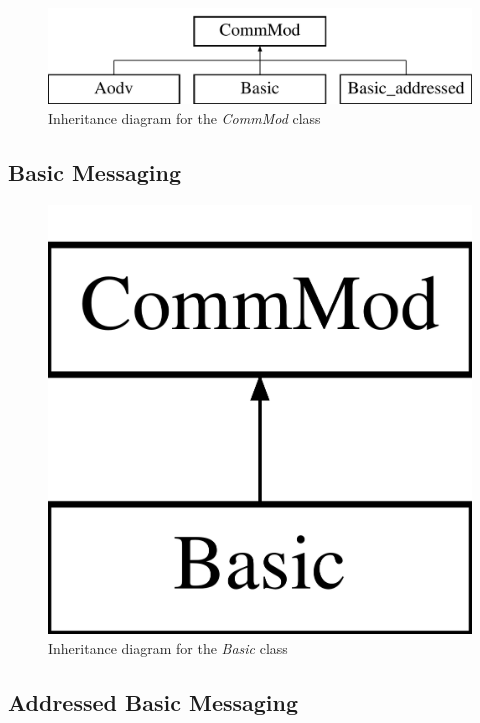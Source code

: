 \begin{figure}
\centering
\includegraphics[scale=0.4]{../documentation/latex/class_comm_mod}	
\caption{Inheritance diagram for the \textit{CommMod} class}
\end{figure}

	\subsection{Basic Messaging}

\begin{figure}[H]
\centering
\includegraphics[scale=0.2]{../documentation/latex/class_basic}	
\caption{Inheritance diagram for the \textit{Basic} class}
\end{figure}
	
	\subsection{Addressed Basic Messaging}

